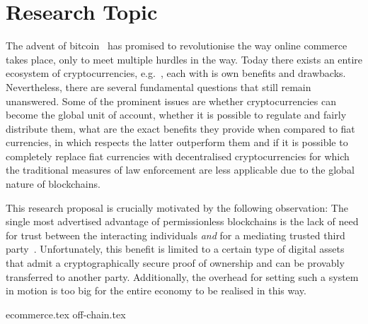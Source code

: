 \section{Research Topic}
  The advent of bitcoin~\cite{bitcoin} has promised to revolutionise the way online
  commerce takes place, only to meet multiple hurdles in the way. Today there exists an
  entire ecosystem of cryptocurrencies, e.g.~\cite{ethereum,zcash,ouroboros}, each with is
  own benefits and drawbacks. Nevertheless, there are several fundamental questions that
  still remain unanswered. Some of the prominent issues are whether cryptocurrencies can
  become the global unit of account, whether it is possible to regulate and fairly
  distribute them, what are the exact benefits they provide when compared to fiat
  currencies, in which respects the latter outperform them and if it is possible to
  completely replace fiat currencies with decentralised cryptocurrencies for which the
  traditional measures of law enforcement are less applicable due to the global nature of
  blockchains.

  This research proposal is crucially motivated by the following observation: The single
  most advertised advantage of permissionless blockchains is the lack of need for trust
  between the interacting individuals \textit{and} for a mediating trusted third
  party~\cite{bitcoin}. Unfortunately, this benefit is limited to a certain type of
  digital assets that admit a cryptographically secure proof of ownership and can be
  provably transferred to another party. Additionally, the overhead for setting such a
  system in motion is too big for the entire economy to be realised in this way.

  {ecommerce.tex}
  {off-chain.tex}
